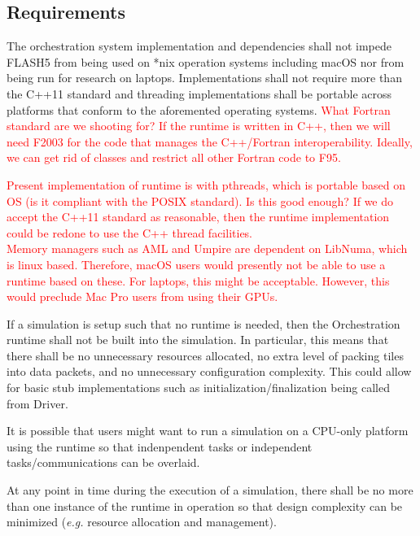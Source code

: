 \documentclass{article}
\begin{document}
\subsection{Requirements}

\begin{req}
The orchestration system implementation and dependencies shall not impede FLASH5
from being used on *nix operation systems including macOS nor from being run for
research on laptops.  Implementations shall not require more than the C++11
standard and threading implementations shall be portable across platforms that
conform to the aforemented operating systems.  \textcolor{red}{What
Fortran standard are we shooting for?  If the runtime is written in C++, then we
will need F2003 for the code that manages the C++/Fortran interoperability.
Ideally, we can get rid of classes and restrict all other Fortran code to F95.}
\end{req}

\textcolor{red}{Present implementation of runtime is with pthreads, which is
portable based on OS (is it compliant with the POSIX standard).  Is this good
enough?  If we do accept the C++11 standard as reasonable, then the runtime
implementation could be redone to use the C++ thread facilities.}\\

\textcolor{red}{Memory managers such as AML and Umpire are dependent on
LibNuma, which is linux based.  Therefore, macOS users would presently not be
able to use a runtime based on these.  For laptops, this might be acceptable.
However, this would preclude Mac Pro users from using their GPUs.}

\begin{req}
If a simulation is setup such that no runtime is needed, then the Orchestration
runtime shall not be built into the simulation.  In particular, this means that
there shall be no unnecessary resources allocated, no extra level of packing
tiles into data packets, and no unnecessary configuration complexity.  This
could allow for basic stub implementations such as initialization/finalization
being called from Driver.  
\end{req}

It is possible that users might want to run a simulation on a CPU-only platform
using the runtime so that indenpendent tasks or independent tasks/communications
can be overlaid.

\begin{req}
At any point in time during the execution of a simulation, there shall be no more
than one instance of the runtime in operation so that design complexity can
be minimized (\textit{e.g.} resource allocation and management).
\end{req}
\end{document}
